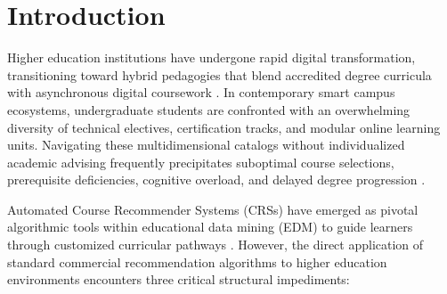 \documentclass[conference,letterpaper]{IEEEtran}
\begin{document}

\section{Introduction}
Higher education institutions have undergone rapid digital transformation, transitioning toward hybrid pedagogies that blend accredited degree curricula with asynchronous digital coursework \cite{hazar2025}. In contemporary smart campus ecosystems, undergraduate students are confronted with an overwhelming diversity of technical electives, certification tracks, and modular online learning units. Navigating these multidimensional catalogs without individualized academic advising frequently precipitates suboptimal course selections, prerequisite deficiencies, cognitive overload, and delayed degree progression \cite{he2017ncf}.

Automated Course Recommender Systems (CRSs) have emerged as pivotal algorithmic tools within educational data mining (EDM) to guide learners through customized curricular pathways \cite{kotsiantis2012}. However, the direct application of standard commercial recommendation algorithms to higher education environments encounters three critical structural impediments:
\end{document}
